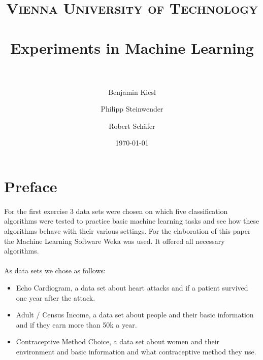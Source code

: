 \documentclass[paper=a4, fontsize=11pt]{scrartcl} %
\title{ 
\normalfont \normalsize 
\textsc{Vienna University of Technology} \\ [25pt] %
\horrule{0.5pt} \\[0.4cm] %
\huge Experiments in Machine Learning \\ %
\horrule{2pt} \\[0.5cm] %
}
\author{Benjamin Kiesl \and Philipp Steinwender \and Robert Sch\"{a}fer} %
\date{\normalsize\today} %
\numberwithin{equation}{section} %
\numberwithin{figure}{section} %
\numberwithin{table}{section} %
\begin{document}
\maketitle %




\section{Preface}

\paragraph{}For the first exercise 3 data sets were chosen on which five classification algorithms were tested to practice basic machine learning tasks and see how these algorithms behave with their various settings. For the elaboration of this paper the Machine Learning Software Weka was used. It offered all necessary algorithms.

\paragraph{}As data sets we chose as follows:

\begin{itemize}
\item Echo Cardiogram, a data set about heart attacks and if a patient survived one year after the attack.
\item Adult / Census Income, a data set about people and their basic information and if they earn more than 50k a year.
\item Contraceptive Method Choice, a data set about women and their environment and basic information and what contraceptive method they use.
\end{itemize}
\end{document}
